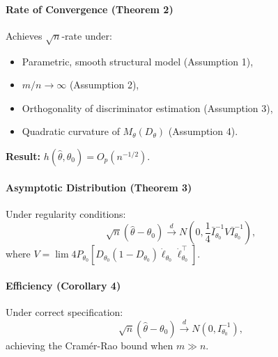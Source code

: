 \documentclass[12pt]{article}
\begin{document}
\paragraph{Rate of Convergence (Theorem 2)} Achieves \(\sqrt{n}\)-rate under:
\begin{itemize}
    \item Parametric, smooth structural model (Assumption 1),
    \item \(m/n \to \infty\) (Assumption 2),
    \item Orthogonality of discriminator estimation (Assumption 3),
    \item Quadratic curvature of \(M_\theta(D_\theta)\) (Assumption 4).
\end{itemize}
\textbf{Result:} \(h(\hat{\theta}, \theta_0) = O_p(n^{-1/2})\).

\paragraph{Asymptotic Distribution (Theorem 3)} Under regularity conditions:
\[
    \sqrt{n}(\hat{\theta} - \theta_0) \xrightarrow{d} N\left(0, \frac{1}{4} \bar{I}_{\theta_0}^{-1} V \bar{I}_{\theta_0}^{-1}\right),
\]
where \(V = \lim 4P_{\theta_0}[D_{\theta_0}(1 -
        D_{\theta_0})\dot{\ell}_{\theta_0}\dot{\ell}_{\theta_0}^\top]\).

\paragraph{Efficiency (Corollary 4)} Under correct specification:
\[
    \sqrt{n}(\hat{\theta} - \theta_0) \xrightarrow{d} N(0, I_{\theta_0}^{-1}),
\]
achieving the Cramér-Rao bound when \(m \gg n\).

\end{document}
